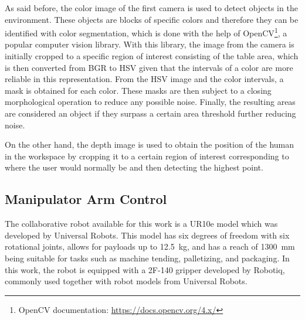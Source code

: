 As said before, the color image of the first camera is used to detect objects in the environment. These objects are blocks of specific colors and therefore they can be identified with color segmentation, which is done with the help of OpenCV\footnote{OpenCV documentation: \url{https://docs.opencv.org/4.x/}}, a popular computer vision library. With this library, the image from the camera is initially cropped to a specific region of interest consisting of the table area, which is then converted from BGR to HSV given that the intervals of a color are more reliable in this representation. From the HSV image and the color intervals, a mask is obtained for each color. These masks are then subject to a closing morphological operation to reduce any possible noise. Finally, the resulting areas are considered an object if they surpass a certain area threshold further reducing noise.

On the other hand, the depth image is used to obtain the position of the human in the workspace by cropping it to a certain region of interest corresponding to where the user would normally be and then detecting the highest point.

\subsection{Manipulator Arm Control}
\label{subsection:manipulator_arm_control}

The collaborative robot available for this work is a UR10e model which was developed by Universal Robots. This model has six degrees of freedom with six rotational joints, allows for payloads up to \SI{12.5}{\kilogram}, and has a reach of \SI{1300}{\milli\metre} being suitable for tasks such as machine tending, palletizing, and packaging\cite{UR10e}. In this work, the robot is equipped with a 2F-140 gripper developed by Robotiq, commonly used together with robot models from Universal Robots\cite{robotiq_gripper}.

